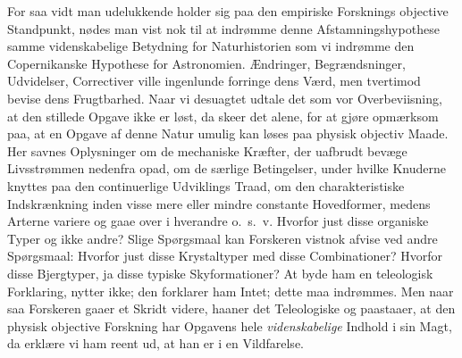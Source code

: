 \documentclass[12pt]{book}
\newcommand{\apage}[1]{\marginnote{\footnotesize\textit{[#1]}}}
\begin{document}
For saa vidt man udelukkende holder sig paa den empiriske Forsknings
objective Standpunkt, nødes man vist nok til at indrømme denne
Afstamningshypothese samme videnskabelige Betydning for Naturhistorien som
vi indrømme den Copernikanske Hypothese for Astronomien. Ændringer,
Begrændsninger, Udvidelser, Correctiver ville ingenlunde forringe dens
Værd, men tvertimod bevise dens Frugtbarhed. Naar vi desuagtet udtale det
som vor Overbeviisning, at den stillede \apage{200} Opgave ikke er løst, da skeer det
alene, for at gjøre opmærksom paa, at en Opgave af denne Natur umulig kan
løses paa physisk objectiv Maade. Her savnes Oplysninger om de mechaniske
Kræfter, der uafbrudt bevæge Livsstrømmen nedenfra opad, om de særlige
Betingelser, under hvilke Knuderne knyttes paa den continuerlige Udviklings
Traad, om den charakteristiske Indskrænkning inden visse mere eller mindre
constante Hovedformer, medens Arterne variere og gaae over i hverandre
o.\ s.\ v. Hvorfor just disse organiske Typer og ikke andre? Slige Spørgsmaal
kan Forskeren vistnok afvise ved andre Spørgsmaal: Hvorfor just disse
Krystaltyper med disse Combinationer? Hvorfor disse Bjergtyper, ja disse
typiske Skyformationer? At byde ham en teleologisk Forklaring, nytter ikke;
den forklarer ham Intet; dette maa indrømmes. Men naar saa Forskeren gaaer
et Skridt videre, haaner det Teleologiske og paastaaer, at den physisk
objective Forskning har Opgavens hele \emph{videnskabelige} Indhold i sin Magt, da
erklære vi ham reent ud, at han er i en Vildfarelse.
\end{document}
